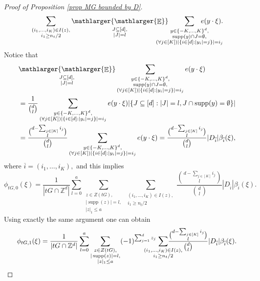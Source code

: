 \documentclass[a4paper,oneside, reqno]{amsart}
\numberwithin{equation}{section}
\theoremstyle{definition}%
\theoremstyle{definition}
\theoremstyle{definition}%
\theoremstyle{definition}
\newcommand{\E}{\mathop{\mathbb{E}}}
\newcommand{\Z}{\mathbb{Z}}
\DeclareMathOperator{\supp}{supp}
\newcommand{\se}[1]{\underset{_{\substack{#1}}}{\mathlarger{\mathlarger{\E}}}}
\begin{document}
\begin{proof}[Proof of Proposition \ref{prop MG bounded by D}]
\[{{}}  
\sum_{\substack{(i_1,\ldots, i_K) \in I(z), \\ 
i_1 \geq n_t/2
}} 
\se{\substack{J \subseteq [d], \\ |J|=l}}\hspace{-0.7cm}
\sum_{\substack{y \in \{-K,...,K\}^d,  
\\ \supp(y) \cap J= \emptyset, 
\\
(\forall j \in [K]) |\{i \in [d]: |y_i|=j\}|=i_j
}} \hspace{-1.2cm} e(y \cdot \xi).
\]
Notice that 
\begin{align*}
&\se{\substack{J \subseteq [d], \\ |J|=l}}
\sum_{\substack{y \in \{-K,...,K\}^d,  
\\ \supp(y) \cap J= \emptyset, 
\\
(\forall j \in [K]) |\{i \in [d]: |y_i|=j\}|=i_j
}} e(y \cdot \xi)\\
&= \frac{1}{\binom{d}{l}}\sum_{\substack{y \in \{-K,...,K\}^d,  
\\
(\forall j \in [K]) |\{i \in [d]: |y_i|=j\}|=i_j
}} e(y \cdot \xi) | \{ J \subseteq [d]: |J|=l, J \cap \supp(y)= \emptyset \}|
\\
&=\frac{\binom{d-\sum_{j \in[K]}i_j}{l}}{\binom{d}{l}} \sum_{\substack{y \in \{-K,...,K\}^d,  
\\
(\forall j \in [K]) |\{i \in [d]: |y_i|=j\}|=i_j
}} e(y \cdot \xi)= \frac{\binom{d-\sum_{j \in[K]}i_j}{l}}{\binom{d}{l}} |D_{\overline{i}}| \beta_{\overline{i}}(\xi), 
\end{align*}
where $\overline{i}=(i_1,\ldots,i_K),$
and this implies 
\[
\phi_{tG,0}(\xi)
=\frac{1}{|tG \cap \Z^d|} \sum_{l=0}^a \sum_{\substack{z \in Z(tG),
\\ |\supp(z)|=l, \\ |z|_1 \le a
}}  
\sum_{\substack{(i_1,\ldots, i_K) \in I(z), \\ 
i_1 \geq n_t/2
}} 
\frac{\binom{d-\sum_{j \in[K]}i_j}{l}}{\binom{d}{l}} |D_{\overline{i}}| \beta_{\overline{i}}(\xi).
\]
Using exactly the same argument one can obtain
\[\phi_{tG,1}(\xi)
=\frac{1}{|tG \cap \Z^d|} \sum_{l=0}^a \sum_{\substack{z \in Z(tG),
\\ |\supp(z)|=l, \\ |z|_1 \le a
}}  (-1)^{\sum_{j=1}^dz_j}
\hspace{-0.7cm}\sum_{\substack{(i_1,\ldots, i_K) \in I(z), \\ 
i_1 \geq n_t/2
}} 
\hspace{-0.8cm}\frac{\binom{d-\sum_{j \in[K]}i_j}{l}}{\binom{d}{l}} |D_{\overline{i}}| \beta_{\overline{i}}(\xi).
\]
\end{proof}
\end{document}
